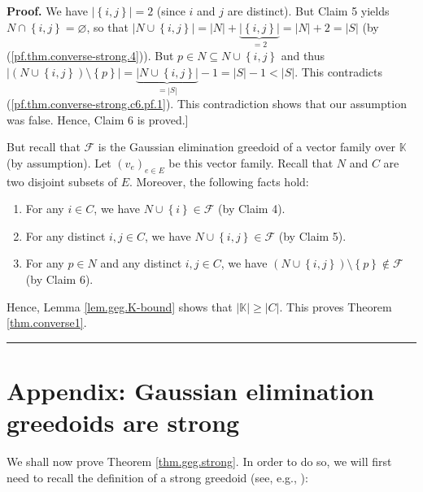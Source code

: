 \documentclass[numbers=enddot,12pt,final,onecolumn,notitlepage]{scrartcl}%
\theoremstyle{definition}
\newenvironment{proof}[1][Proof]{\noindent\textbf{#1.} }{\ \rule{0.5em}{0.5em}}
\renewcommand{\geq}{\geqslant}
\theoremstyle{plainsl}
\begin{document}
\begin{proof}
We have $\left\vert \left\{  i,j\right\}  \right\vert =2$ (since $i$ and $j$
are distinct). But Claim 5 yields $N\cap\left\{  i,j\right\}  =\varnothing$,
so that $\left\vert N\cup\left\{  i,j\right\}  \right\vert =\left\vert
N\right\vert +\underbrace{\left\vert \left\{  i,j\right\}  \right\vert }%
_{=2}=\left\vert N\right\vert +2=\left\vert S\right\vert $ (by
(\ref{pf.thm.converse-strong.4})). But $p\in N\subseteq N\cup\left\{
i,j\right\}  $ and thus $\left\vert \left(  N\cup\left\{  i,j\right\}
\right)  \setminus\left\{  p\right\}  \right\vert =\underbrace{\left\vert
N\cup\left\{  i,j\right\}  \right\vert }_{=\left\vert S\right\vert
}-1=\left\vert S\right\vert -1<\left\vert S\right\vert $. This contradicts
(\ref{pf.thm.converse-strong.c6.pf.1}). This contradiction shows that our
assumption was false. Hence, Claim 6 is proved.] \medskip

But recall that $\mathcal{F}$ is the Gaussian elimination greedoid of a vector
family over $\mathbb{K}$ (by assumption). Let $\left(  v_{e}\right)  _{e\in
E}$ be this vector family. Recall that $N$ and $C$ are two disjoint subsets of
$E$. Moreover, the following facts hold:

\begin{enumerate}
\item[\textbf{(i)}] For any $i\in C$, we have $N\cup\left\{  i\right\}
\in\mathcal{F}$ (by Claim 4).

\item[\textbf{(ii)}] For any distinct $i,j\in C$, we have $N\cup\left\{
i,j\right\}  \in\mathcal{F}$ (by Claim 5).

\item[\textbf{(iii)}] For any $p\in N$ and any distinct $i,j\in C$, we have
$\left(  N\cup\left\{  i,j\right\}  \right)  \setminus\left\{  p\right\}
\notin\mathcal{F}$ (by Claim 6).
\end{enumerate}

Hence, Lemma \ref{lem.geg.K-bound} shows that $\left\vert \mathbb{K}%
\right\vert \geq\left\vert C\right\vert $. This proves Theorem
\ref{thm.converse1}.
\end{proof}

\section{\label{sect.plucker}Appendix: Gaussian elimination greedoids are
strong}

We shall now prove Theorem \ref{thm.geg.strong}. In order to do so, we will
first need to recall the definition of a strong greedoid (see, e.g.,
\cite[\S 6.1]{GriPet19}):
\end{document}
